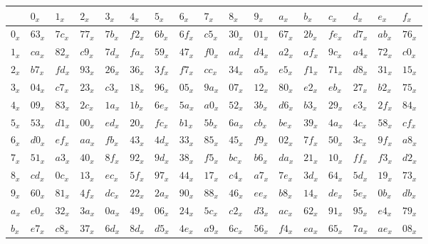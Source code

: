 \documentclass{report}
\begin{document}
\begin{table}[h!]
\centering
\begin{tabular}{|l|l|l|l|l|l|l|l|l|l|l|l|l|l|l|l|l|}
\hline
 & $0_x$  & $1_x$  & $2_x$  & $3_x$  & $4_x$  & $5_x$  & $6_x$  & $7_x$  & $8_x$  & $9_x$  & $a_x$  & $b_x$  & $c_x$  & $d_x$  & $e_x$  & $f_x$  \\ \hline
$0_x$ & $63_x$ & $7c_x$ & $77_x$ & $7b_x$ & $f2_x$ & $6b_x$ & $6f_x$ & $c5_x$ & $30_x$ & $01_x$ & $67_x$ & $2b_x$ & $fe_x$ & $d7_x$ & $ab_x$ & $76_x$ \\ \hline
$1_x$ & $ca_x$ & $82_x$ & $c9_x$ & $7d_x$ & $fa_x$ & $59_x$ & $47_x$ & $f0_x$ & $ad_x$ & $d4_x$ & $a2_x$ & $af_x$ & $9c_x$ & $a4_x$ & $72_x$ & $c0_x$ \\ \hline
$2_x$ & $b7_x$ & $fd_x$ & $93_x$ & $26_x$ & $36_x$ & $3f_x$ & $f7_x$ & $cc_x$ & $34_x$ & $a5_x$ & $e5_x$ & $f1_x$ & $71_x$ & $d8_x$ & $31_x$ & $15_x$ \\ \hline
$3_x$ & $04_x$ & $c7_x$ & $23_x$ & $c3_x$ & $18_x$ & $96_x$ & $05_x$ & $9a_x$ & $07_x$ & $12_x$ & $80_x$ & $e2_x$ & $eb_x$ & $27_x$ & $b2_x$ & $75_x$ \\ \hline
$4_x$ & $09_x$ & $83_x$ & $2c_x$ & $1a_x$ & $1b_x$ & $6e_x$ & $5a_x$ & $a0_x$ & $52_x$ & $3b_x$ & $d6_x$ & $b3_x$ & $29_x$ & $e3_x$ & $2f_x$ & $84_x$ \\ \hline
$5_x$ & $53_x$ & $d1_x$ & $00_x$ & $ed_x$ & $20_x$ & $fc_x$ & $b1_x$ & $5b_x$ & $6a_x$ & $cb_x$ & $be_x$ & $39_x$ & $4a_x$ & $4c_x$ & $58_x$ & $cf_x$ \\ \hline
$6_x$ & $d0_x$ & $ef_x$ & $aa_x$ & $fb_x$ & $43_x$ & $4d_x$ & $33_x$ & $85_x$ & $45_x$ & $f9_x$ & $02_x$ & $7f_x$ & $50_x$ & $3c_x$ & $9f_x$ & $a8_x$ \\ \hline
$7_x$ & $51_x$ & $a3_x$ & $40_x$ & $8f_x$ & $92_x$ & $9d_x$ & $38_x$ & $f5_x$ & $bc_x$ & $b6_x$ & $da_x$ & $21_x$ & $10_x$ & $ff_x$ & $f3_x$ & $d2_x$ \\ \hline
$8_x$ & $cd_x$ & $0c_x$ & $13_x$ & $ec_x$ & $5f_x$ & $97_x$ & $44_x$ & $17_x$ & $c4_x$ & $a7_x$ & $7e_x$ & $3d_x$ & $64_x$ & $5d_x$ & $19_x$ & $73_x$ \\ \hline
$9_x$ & $60_x$ & $81_x$ & $4f_x$ & $dc_x$ & $22_x$ & $2a_x$ & $90_x$ & $88_x$ & $46_x$ & $ee_x$ & $b8_x$ & $14_x$ & $de_x$ & $5e_x$ & $0b_x$ & $db_x$ \\ \hline
$a_x$ & $e0_x$ & $32_x$ & $3a_x$ & $0a_x$ & $49_x$ & $06_x$ & $24_x$ & $5c_x$ & $c2_x$ & $d3_x$ & $ac_x$ & $62_x$ & $91_x$ & $95_x$ & $e4_x$ & $79_x$ \\ \hline
$b_x$ & $e7_x$ & $c8_x$ & $37_x$ & $6d_x$ & $8d_x$ & $d5_x$ & $4e_x$ & $a9_x$ & $6c_x$ & $56_x$ & $f4_x$ & $ea_x$ & $65_x$ & $7a_x$ & $ae_x$ & $08_x$ \\ \hline

\end{tabular}
\end{table}
\end{document}
